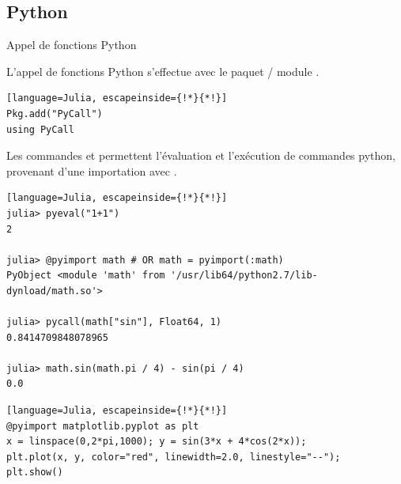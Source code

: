 \subsection{Python}
\begin{frame}[containsverbatim]{Appel de fonctions Python}
\par{L'appel de fonctions Python s'effectue avec le paquet / module .}
\begin{lstlisting}[language=Julia, escapeinside={!*}{*!}]
Pkg.add("PyCall")
using PyCall
\end{lstlisting}
\par{Les commandes  et  permettent l'évaluation et l'exécution de commandes python, provenant d'une importation avec .}
\begin{lstlisting}[language=Julia, escapeinside={!*}{*!}]
julia> pyeval("1+1")
2

julia> @pyimport math # OR math = pyimport(:math)
PyObject <module 'math' from '/usr/lib64/python2.7/lib-dynload/math.so'>

julia> pycall(math["sin"], Float64, 1)
0.8414709848078965

julia> math.sin(math.pi / 4) - sin(pi / 4)
0.0
\end{lstlisting}
\vspace{-2ex}
\begin{lstlisting}[language=Julia, escapeinside={!*}{*!}]
@pyimport matplotlib.pyplot as plt
x = linspace(0,2*pi,1000); y = sin(3*x + 4*cos(2*x));
plt.plot(x, y, color="red", linewidth=2.0, linestyle="--");
plt.show()
\end{lstlisting}
\end{frame}


